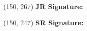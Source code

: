 \documentclass{article}
\begin{document}
\begin{textblock}{70}(150, 267)
    \textbf{JR Signature:}
\end{textblock}

\begin{textblock}{70}(150, 247)
    \textbf{SR Signature:}
\end{textblock}
\end{document}
